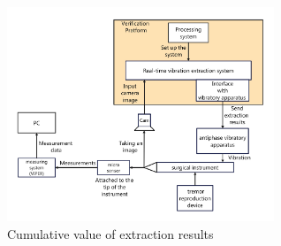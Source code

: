 \begin{figure}[tb]
  \centering
  \includegraphics[width = 8cm,pagebox=cropbox,clip]{img/suppression_test.pdf}
  \caption{Cumulative value of extraction results}
  \label{figure:suppression_test}
\end{figure}
